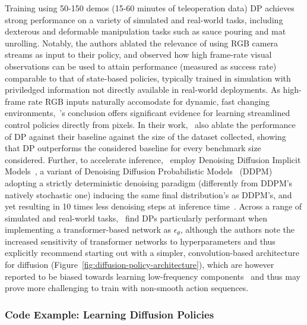 Training using 50-150 demos (15-60 minutes of teleoperation data) DP achieves strong performance on a variety of simulated and real-world tasks, including dexterous and deformable manipulation tasks such as sauce pouring and mat unrolling.
Notably, the authors ablated the relevance of using RGB camera streams as input to their policy, and observed how high frame-rate visual observations can be used to attain performance (measured as success rate) comparable to that of state-based policies, typically trained in simulation with priviledged information not directly available in real-world deployments.
As high-frame rate RGB inputs naturally accomodate for dynamic, fast changing environments,~\citet{chiDiffusionPolicyVisuomotor2024}'s conclusion offers significant evidence for learning streamlined control policies directly from pixels.
In their work,~\citet{chiDiffusionPolicyVisuomotor2024} also ablate the performance of DP against their baseline against the size of the dataset collected, showing that DP outperforms the considered baseline for every benchmark size considered.
Further, to accelerate inference,~\citet{chiDiffusionPolicyVisuomotor2024} employ Denoising Diffusion Implicit Models~\citep{songDenoisingDiffusionImplicit2022}, a variant of Denoising Diffusion Probabilistic Models~\citep{hoDenoisingDiffusionProbabilistic2020} (DDPM) adopting a strictly deterministic denoising paradigm (differently from DDPM's natively stochastic one) inducing the same final distribution's as DDPM's, and yet resulting in 10 times less denoising steps at inference time~\citep{chiDiffusionPolicyVisuomotor2024}.
Across a range of simulated and real-world tasks,~\citet{chiDiffusionPolicyVisuomotor2024} find DPs particularly performant when implementing a transformer-based network as \( \epsilon_\theta \), although the authors note the increased sensitivity of transformer networks to hyperparameters and thus explicitly recommend starting out with a simpler, convolution-based architecture for diffusion (Figure~\ref{fig:diffusion-policy-architecture}), which are however reported to be biased towards learning low-frequency components~\citep{tancikFourierFeaturesLet2020} and thus may prove more challenging to train with non-smooth action sequences.


\subsubsection{Code Example: Learning Diffusion Policies}

